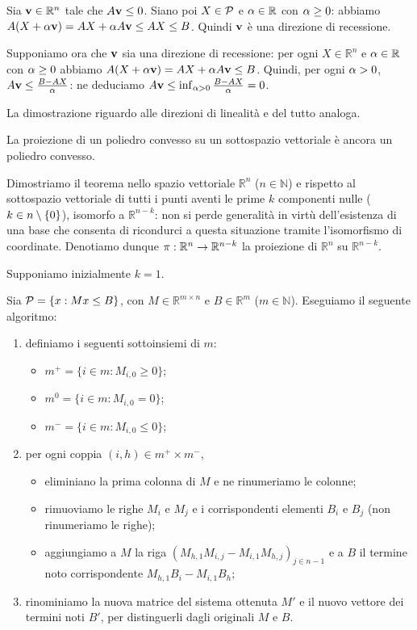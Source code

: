 \Proof Sia $\mathbf{v} \in \mathbb{R}^n$ tale che $A\mathbf{v} \leq 0$. Siano poi $X \in \mathcal{P}$ e $\alpha \in \mathbb{R}$ con $\alpha \geq 0$: abbiamo $A(X + \alpha\mathbf{v}) = AX + \alpha A\mathbf{v} \leq AX \leq B$. Quindi $\mathbf{v}$ \`e una direzione di recessione.
\par Supponiamo ora che $\mathbf{v}$ sia una direzione di recessione: per ogni $X \in \mathbb{R}^n$ e $\alpha \in \mathbb{R}$ con $\alpha \geq 0$ abbiamo $A(X + \alpha\mathbf{v}) = AX + \alpha A \mathbf{v} \leq B$. Quindi, per ogni $\alpha > 0$, $A\mathbf{v} \leq \frac{B - AX}{\alpha}$: ne deduciamo $A\mathbf{v} \leq \inf_{\alpha > 0} \frac{B - AX}{\alpha} = 0$.
\par La dimostrazione riguardo alle direzioni di linealit\`a e del tutto analoga. \EndProof
\begin{Theorem}
	La proiezione di un poliedro convesso su un sottospazio vettoriale \`e ancora un poliedro convesso.
\end{Theorem}
\Proof Dimostriamo il teorema nello spazio vettoriale $\mathbb{R}^n$ ($n \in \mathbb{N}$) e rispetto al sottospazio vettoriale di tutti i punti aventi le prime $k$ componenti nulle ($k \in n \setminus \lbrace 0 \rbrace$), isomorfo a $\mathbb{R}^{n - k}$: non si perde generalit\`a in virt\`u dell'esistenza di una base che consenta di ricondurci a questa situazione tramite l'isomorfismo di coordinate. Denotiamo dunque $\Projection: \mathbb{R}^n \rightarrow \mathbb{R}^{n - k}$ la proiezione di $\mathbb{R}^n$ su $\mathbb{R}^{n - k}$.
\par Supponiamo inizialmente $k = 1$.
\par Sia $\mathcal{P} = \lbrace x: M x \leq B \rbrace$, con $M \in \mathbb{R}^{m \times n}$ e $B \in \mathbb{R}^m$ ($m \in \mathbb{N}$). Eseguiamo il seguente algoritmo:
\begin{enumerate}
	\item definiamo i seguenti sottoinsiemi di $m$:
	\begin{itemize}
		\item $m^+ = \lbrace i \in m: M_{i,0} \geq 0 \rbrace$;
		\item $m^0 = \lbrace i \in m: M_{i,0} = 0 \rbrace$;
		\item $m^- = \lbrace i \in m: M_{i,0} \leq 0 \rbrace$;
	\end{itemize}
	\item per ogni coppia $(i,h) \in m^+ \times m^-$,
	\begin{itemize}
		\item eliminiano la prima colonna di $M$ e ne rinumeriamo le colonne;
		\item rimuoviamo le righe $M_i$ e $M_j$ e i corrispondenti elementi $B_i$ e $B_j$ (non rinumeriamo le righe);
		\item aggiungiamo a $M$ la riga $(M_{h,1}M_{i,j} - M_{i,1}M_{h,j})_{j \in n - 1}$ e a $B$ il termine noto corrispondente $M_{h,1}B_i - M_{i,1}B_h$;
	\end{itemize}
	\item rinominiamo la nuova matrice del sistema ottenuta $M'$ e il nuovo vettore dei termini noti $B'$, per distinguerli dagli originali $M$ e $B$.
\end{enumerate}
